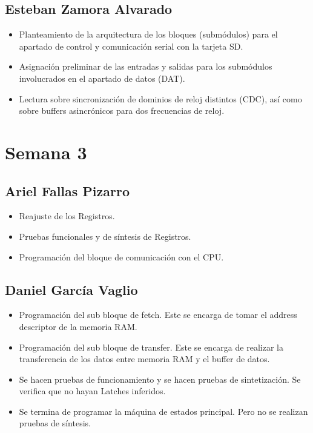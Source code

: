 \subsection{Esteban Zamora Alvarado}
\begin{itemize}
\item Planteamiento de la arquitectura de los bloques (submódulos) para el apartado de control y
comunicación serial con la tarjeta SD.
\item Asignación preliminar de las entradas y salidas para los submódulos involucrados en el
  apartado de datos (DAT).
\item Lectura sobre sincronización de dominios de reloj distintos (CDC), así como sobre buffers
  asincrónicos para dos frecuencias de reloj.
\end{itemize}
\newpage
\section{Semana 3}
\subsection{Ariel Fallas Pizarro}
\begin{itemize}
\item Reajuste de los Registros.
\item Pruebas funcionales y de síntesis de Registros.
\item Programación del bloque de comunicación con el CPU.
\end{itemize}

\subsection{Daniel García Vaglio}
\begin{itemize}
\item Programación del sub bloque de fetch. Este se encarga de tomar el address descriptor de la
  memoria RAM. 
\item Programación del sub bloque de transfer. Este se encarga de realizar la transferencia de los
  datos entre memoria RAM y el buffer de datos. 
\item Se hacen pruebas de funcionamiento y se hacen pruebas de sintetización. Se verifica que no
  hayan Latches inferidos. 
\item Se termina de programar la máquina de estados principal. Pero no se realizan pruebas de
  síntesis.  
\end{itemize}

